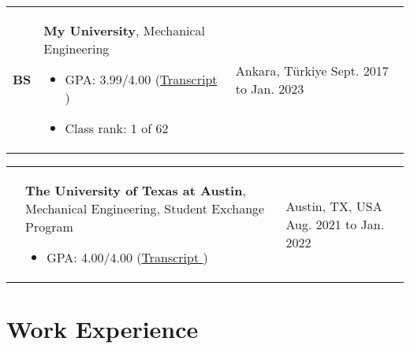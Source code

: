\documentclass[10pt, a4paper]{article}
\newenvironment{highlights}{
        \begin{itemize}[
                topsep=0pt,
                parsep=0.07 cm,
                partopsep=0pt,
                itemsep=0pt,
                after=\vspace*{-1\baselineskip},
                leftmargin=0.6 cm + 3pt
            ]
    }{
        \end{itemize}
    } %
\let\hrefWithoutArrow\href
\renewcommand{\href}[2]{\hrefWithoutArrow{#1}{#2 \raisebox{.15ex}{\footnotesize \faExternalLink*}}}
\begin{document}
        \begin{tabularx}{ cm-0.13cm}{L{0.85cm} K{0.2 cm} R{3.6 cm}}
            \textbf{BS}
            & 
            \textbf{My University}, Mechanical Engineering
            \vspace*{0.12 cm}
            \begin{highlights}
                \item GPA: 3.99/4.00 (\href{https://example.com/}{Transcript}) 
                \item Class rank: 1 of 62 \hspace*{-0.2cm}
            \end{highlights}
        &
            Ankara, Türkiye \newline
            Sept. 2017 to Jan. 2023
        \end{tabularx}

        \vspace*{0.12 cm}
        
        \begin{tabularx}{ cm-0.13cm}{L{0.85cm} K{0.2 cm} R{3.6 cm}}
            \textbf{}
            & 
            \textbf{The University of Texas at Austin}, Mechanical Engineering, Student Exchange Program
            \vspace*{0.12 cm}
            \begin{highlights}
                \item GPA: 4.00/4.00 (\href{https://example.com/}{Transcript}) \hspace*{-0.2cm}
            \end{highlights}
        &
            Austin, TX, USA \newline
            Aug. 2021 to Jan. 2022
        \end{tabularx}



    \section{Work Experience}
    
\end{document}
